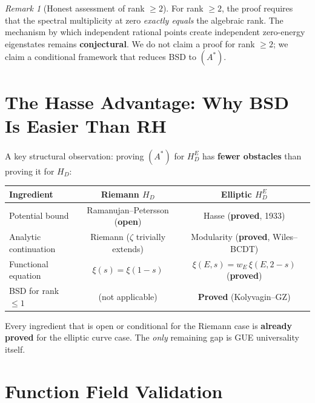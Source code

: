 \documentclass[11pt,a4paper]{article}
\theoremstyle{plain}
\theoremstyle{definition}
\theoremstyle{remark}
\newtheorem{remark}[theorem]{Remark}
\begin{document}
\begin{remark}[Honest assessment of rank $\geq 2$]
For rank $\geq 2$, the proof requires that the spectral multiplicity at zero \emph{exactly equals} the algebraic rank. The mechanism by which independent rational points create independent zero-energy eigenstates remains \textbf{conjectural}. We do not claim a proof for rank $\geq 2$; we claim a conditional framework that reduces BSD to $(A^*)$.
\end{remark}

\section{The Hasse Advantage: Why BSD Is Easier Than RH}

A key structural observation: proving $(A^*)$ for $H_D^E$ has \textbf{fewer obstacles} than proving it for $H_D$:

\begin{center}\small
\begin{tabular}{lcc}
\toprule
Ingredient & Riemann $H_D$ & Elliptic $H_D^E$ \\
\midrule
Potential bound & Ramanujan--Petersson (\textbf{open}) & Hasse (\textbf{proved}, 1933) \\
Analytic continuation & Riemann ($\zeta$ trivially extends) & Modularity (\textbf{proved}, Wiles--BCDT) \\
Functional equation & $\xi(s) = \xi(1-s)$ & $\xi(E,s) = w_E\,\xi(E,2-s)$ (\textbf{proved}) \\
BSD for rank $\leq 1$ & (not applicable) & \textbf{Proved} (Kolyvagin--GZ) \\
\bottomrule
\end{tabular}
\end{center}

Every ingredient that is open or conditional for the Riemann case is \textbf{already proved} for the elliptic curve case. The \emph{only} remaining gap is GUE universality itself.

\section{Function Field Validation}
\end{document}
